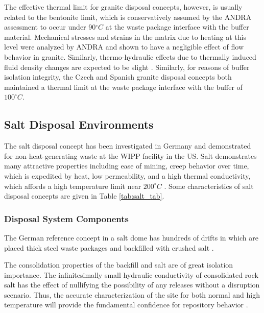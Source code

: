 The effective thermal limit for granite disposal concepts, however, is usually 
related to the bentonite limit, which is conservatively assumed by the \gls{ANDRA} assessment to occur under 
90$^{\circ}C$ at the waste package interface with the buffer material.  
Mechanical stresses and strains in the matrix due to heating at this 
level were analyzed by \gls{ANDRA} and shown to have a negligible effect of 
flow behavior in granite. Similarly, thermo-hydraulic effects due to thermally
induced fluid density changes are expected to be slight 
\cite{andra_granite:_2005}.
Similarly, for reasons of buffer isolation integrity, the Czech and Spanish
granite disposal concepts both maintained a thermal limit at the waste package
interface with the buffer of $100^{\circ}C$.  \cite{von_lensa_red-impact_2008}

\subsection{Salt Disposal Environments}

The salt disposal concept has been investigated in Germany and demonstrated for 
non-heat-generating waste at the \gls{WIPP} facility in the US. Salt 
demonstrates many attractive properties including ease of mining, creep behavior 
over time, which is expedited by heat, low permeability, and a high thermal 
conductivity, which affords a high temperature limit near $200^{\circ}C$ 
\cite{hardin_generic_2011} .
Some characteristics of salt disposal 
concepts are given in Table \ref{tab:salt_tab}.   



\subsubsection{Disposal System Components}

The German reference concept in a salt dome has hundreds of drifts in which 
are placed thick steel waste packages and backfilled with crushed salt 
\cite{von_lensa_red-impact_2008}. 

The consolidation properties of the backfill and salt are of great isolation 
importance. The infinitesimally small hydraulic conductivity of consolidated 
rock salt has the effect of nullifying the possibility of any releases without 
a disruption scenario. Thus, the accurate characterization of the site for both 
normal and high temperature will provide the fundamental confidence for 
repository behavior \cite{brewitz_long-term_2002}.


